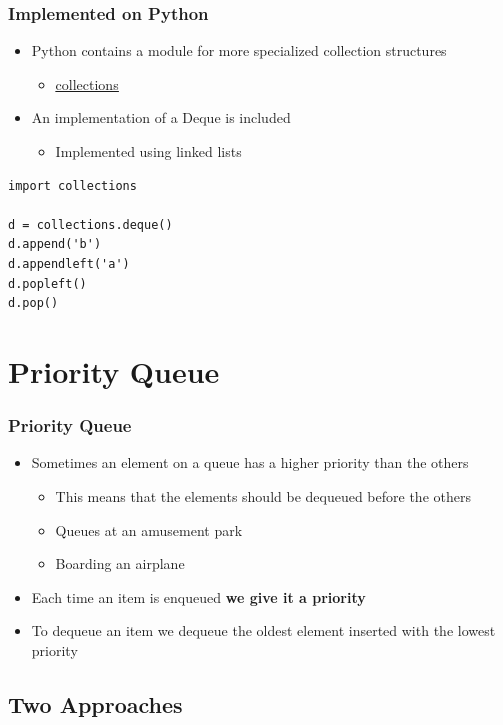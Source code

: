 \documentclass[11pt]{beamer}
\begin{document}
\begin{frame}[fragile]\frametitle{Implemented on Python}
\begin{itemize}
\item Python contains a module for more specialized collection structures
    \begin{itemize}
    \item \href{https://docs.python.org/3/library/collections.html}{\color{blue}\underline{collections}}
    \end{itemize}
\item An implementation of a Deque is included
    \begin{itemize}
    \item Implemented using linked lists
    \end{itemize}
\end{itemize}
\begin{lstlisting}
import collections

d = collections.deque()
d.append('b')
d.appendleft('a')
d.popleft()
d.pop()
\end{lstlisting}
\end{frame}


\section{Priority Queue}

\begin{frame}\frametitle{Priority Queue}
\begin{itemize}
\item Sometimes an element on a queue has a higher priority than the others
    \begin{itemize}
    \item This means that the elements should be dequeued before the others
    \item Queues at an amusement park
    \item Boarding an airplane
    \end{itemize}
\item Each time an item is enqueued \textbf{we give it a priority}
\item To dequeue an item we dequeue the oldest element inserted with the lowest priority
\end{itemize}
\end{frame}

\subsection{Two Approaches}
\end{document}
